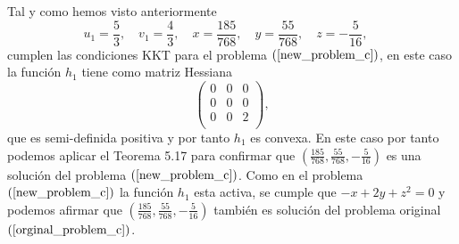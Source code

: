 Tal y como hemos visto anteriormente
\begin{equation*}
    u_1 = \frac{5}{3}, \quad
    v_1 = \frac{4}{3}, \quad
    x = \frac{185}{768}, \quad
    y = \frac{55}{768}, \quad
    z = -\frac{5}{16}, \quad
\end{equation*}
cumplen las condiciones KKT para el problema $(\ref{new_problem_c})$,
en este caso la función $h_1$ tiene como matriz Hessiana
\begin{equation*}
    \begin{pmatrix}
        0 & 0 & 0 \\
        0 & 0 & 0 \\
        0 & 0 & 2 \\
    \end{pmatrix},
\end{equation*}
que es semi-definida positiva y por tanto $h_1$ es convexa.
En este caso por tanto podemos aplicar el Teorema 5.17 para confirmar que $(\frac{185}{768}, \frac{55}{768}, -\frac{5}{16})$ es una solución del problema $(\ref{new_problem_c})$.
Como en el problema $(\ref{new_problem_c})$ la función $h_1$ esta activa,
se cumple que $-x + 2y + z^2 = 0$ y podemos afirmar que $(\frac{185}{768}, \frac{55}{768}, -\frac{5}{16})$ también es solución del problema original $(\ref{orginal_problem_c})$.

